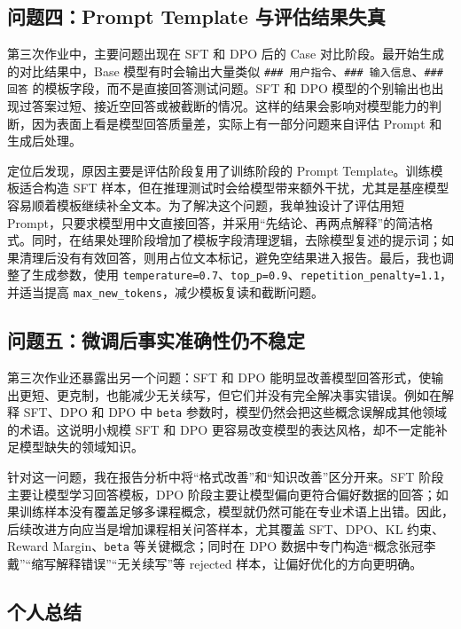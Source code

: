 \documentclass[a4paper,12pt]{ctexart}
\begin{document}
\subsection{问题四：Prompt Template 与评估结果失真}

第三次作业中，主要问题出现在 SFT 和 DPO 后的 Case 对比阶段。最开始生成的对比结果中，Base 模型有时会输出大量类似 \texttt{\#\#\# 用户指令}、\texttt{\#\#\# 输入信息}、\texttt{\#\#\# 回答} 的模板字段，而不是直接回答测试问题。SFT 和 DPO 模型的个别输出也出现过答案过短、接近空回答或被截断的情况。这样的结果会影响对模型能力的判断，因为表面上看是模型回答质量差，实际上有一部分问题来自评估 Prompt 和生成后处理。

定位后发现，原因主要是评估阶段复用了训练阶段的 Prompt Template。训练模板适合构造 SFT 样本，但在推理测试时会给模型带来额外干扰，尤其是基座模型容易顺着模板继续补全文本。为了解决这个问题，我单独设计了评估用短 Prompt，只要求模型用中文直接回答，并采用“先结论、再两点解释”的简洁格式。同时，在结果处理阶段增加了模板字段清理逻辑，去除模型复述的提示词；如果清理后没有有效回答，则用占位文本标记，避免空结果进入报告。最后，我也调整了生成参数，使用 \texttt{temperature=0.7}、\texttt{top\_p=0.9}、\texttt{repetition\_penalty=1.1}，并适当提高 \texttt{max\_new\_tokens}，减少模板复读和截断问题。

\subsection{问题五：微调后事实准确性仍不稳定}

第三次作业还暴露出另一个问题：SFT 和 DPO 能明显改善模型回答形式，使输出更短、更克制，也能减少无关续写，但它们并没有完全解决事实错误。例如在解释 SFT、DPO 和 DPO 中 \texttt{beta} 参数时，模型仍然会把这些概念误解成其他领域的术语。这说明小规模 SFT 和 DPO 更容易改变模型的表达风格，却不一定能补足模型缺失的领域知识。

针对这一问题，我在报告分析中将“格式改善”和“知识改善”区分开来。SFT 阶段主要让模型学习回答模板，DPO 阶段主要让模型偏向更符合偏好数据的回答；如果训练样本没有覆盖足够多课程概念，模型就仍然可能在专业术语上出错。因此，后续改进方向应当是增加课程相关问答样本，尤其覆盖 SFT、DPO、KL 约束、Reward Margin、\texttt{beta} 等关键概念；同时在 DPO 数据中专门构造“概念张冠李戴”“缩写解释错误”“无关续写”等 rejected 样本，让偏好优化的方向更明确。

\subsection{个人总结}
\end{document}

